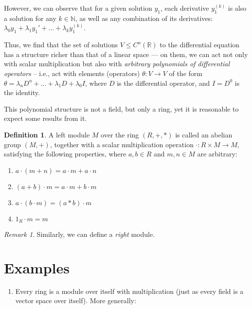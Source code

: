 \documentclass{article}
\newif\ifusemulticols
\theoremstyle{definition}
\newtheorem{deff}{Definition}
\theoremstyle{remark}
\newtheorem*{note}{Remark}
\theoremstyle{plain}
\theoremstyle{plain}
\newenvironment{mymulticols}
    { \ifusemulticols \begin{multicols}{2} \fi }
    { \ifusemulticols \end{multicols} \fi }
\newcommand{\N}{\mathbb{N}}
\begin{document}
\begin{mymulticols}
\begin{enumerate}
        However, we can observe that for a given solution $y_1$, each derivative $y_1^{(k)}$ is also
        a solution for any $k \in \N$, as well as any combination of its derivatives: $\lambda_0 y_1
        + \lambda_1 y_1' + \ldots + \lambda_k y_1^{(k)}$.

        Thus, we find that the set of solutions $V \le C^n(\mathbb{R})$ to the differential equation
        has a structure richer than that of a linear space --- on them, we can act not only with
        scalar multiplication but also with \emph{arbitrary polynomials of differential operators}
        -- i.e., act with elements (operators) $\theta : V \to V$ of the form $\theta = \lambda_n
        D^n + \ldots + \lambda_1 D + \lambda_0 I$, where $D$ is the differential operator, and $I =
        D^0$ is the identity.

        This polynomial structure is not a field, but only a ring, yet it is reasonable to expect
        some results from it. 
\end{enumerate}

\begin{deff}
    A left module $M$ over the ring $(R, +, *)$ is called an abelian group $(M, +)$, together with a scalar multiplication operation ${\cdot: R\times M \to M}$, satisfying the following properties, where $a, b \in R$ and $m, n \in M$ are arbitrary:
    \begin{enumerate}
        \item $a \cdot (m + n) = a \cdot m + a \cdot n$
        \item $(a + b) \cdot m = a \cdot m + b \cdot m$
        \item $a \cdot (b \cdot m) = (a * b) \cdot m$
        \item $1_R \cdot m = m$
    \end{enumerate}
\end{deff}

\begin{note}
    Similarly, we can define a \textit{right} module.
\end{note}

\section{Examples}
\begin{enumerate}
    \item Every ring is a module over itself with multiplication (just as every field is a vector
        space over itself). More generally:


\end{enumerate}
\end{mymulticols}
\end{document}
